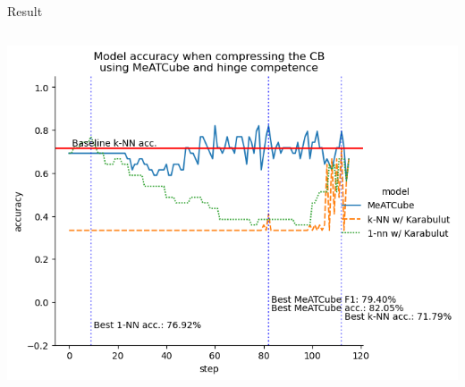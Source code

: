 \documentclass[]{beamer}
\begin{document}
\begin{frame}{Result}
\begin{columns}
\begin{column}{.65\textwidth}
            \includegraphics[width=.8\textwidth]{../results-weight-estim+/figs/breast+cancer+wisconsin+prognostic.png}
        \end{column}
    \end{columns}
\end{frame}
\end{document}
